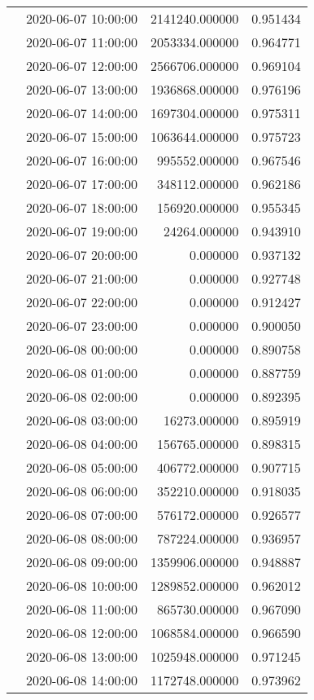 \begin{tabular}{llrr}
 & 2020-06-07 10:00:00 & 2141240.000000 & 0.951434 \\
 & 2020-06-07 11:00:00 & 2053334.000000 & 0.964771 \\
 & 2020-06-07 12:00:00 & 2566706.000000 & 0.969104 \\
 & 2020-06-07 13:00:00 & 1936868.000000 & 0.976196 \\
 & 2020-06-07 14:00:00 & 1697304.000000 & 0.975311 \\
 & 2020-06-07 15:00:00 & 1063644.000000 & 0.975723 \\
 & 2020-06-07 16:00:00 & 995552.000000 & 0.967546 \\
 & 2020-06-07 17:00:00 & 348112.000000 & 0.962186 \\
 & 2020-06-07 18:00:00 & 156920.000000 & 0.955345 \\
 & 2020-06-07 19:00:00 & 24264.000000 & 0.943910 \\
 & 2020-06-07 20:00:00 & 0.000000 & 0.937132 \\
 & 2020-06-07 21:00:00 & 0.000000 & 0.927748 \\
 & 2020-06-07 22:00:00 & 0.000000 & 0.912427 \\
 & 2020-06-07 23:00:00 & 0.000000 & 0.900050 \\
 & 2020-06-08 00:00:00 & 0.000000 & 0.890758 \\
 & 2020-06-08 01:00:00 & 0.000000 & 0.887759 \\
 & 2020-06-08 02:00:00 & 0.000000 & 0.892395 \\
 & 2020-06-08 03:00:00 & 16273.000000 & 0.895919 \\
 & 2020-06-08 04:00:00 & 156765.000000 & 0.898315 \\
 & 2020-06-08 05:00:00 & 406772.000000 & 0.907715 \\
 & 2020-06-08 06:00:00 & 352210.000000 & 0.918035 \\
 & 2020-06-08 07:00:00 & 576172.000000 & 0.926577 \\
 & 2020-06-08 08:00:00 & 787224.000000 & 0.936957 \\
 & 2020-06-08 09:00:00 & 1359906.000000 & 0.948887 \\
 & 2020-06-08 10:00:00 & 1289852.000000 & 0.962012 \\
 & 2020-06-08 11:00:00 & 865730.000000 & 0.967090 \\
 & 2020-06-08 12:00:00 & 1068584.000000 & 0.966590 \\
 & 2020-06-08 13:00:00 & 1025948.000000 & 0.971245 \\
 & 2020-06-08 14:00:00 & 1172748.000000 & 0.973962 \\

\end{tabular}
